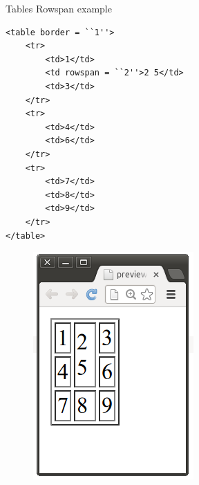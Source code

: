 \documentclass[14pt]{beamer}
\begin{document}
\begin{frame}[fragile]{Tables}
Rowspan example

\begin{minipage}{7cm}
\begin{lstlisting}
<table border = ``1''>
    <tr>
        <td>1</td>
        <td rowspan = ``2''>2 5</td>
        <td>3</td>
    </tr>
    <tr>
        <td>4</td>
        <td>6</td>
    </tr>
    <tr>
        <td>7</td>
        <td>8</td>
        <td>9</td>
    </tr>
</table>
\end{lstlisting}
\end{minipage}
\quad
\begin{minipage}{2cm}
\begin{figure}[H]
 \includegraphics[scale=.3]{tables-rowspan-ex.png}
\end{figure}
\end{minipage}
\end{frame}
\end{document}
